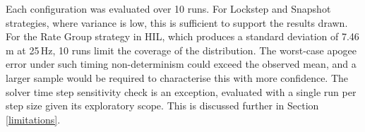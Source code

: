 Each configuration was evaluated over 10 runs. For Lockstep and Snapshot strategies, where variance is low, this is sufficient to support the results drawn. For the Rate Group strategy in HIL, which produces a standard deviation of 7.46\,m at 25\,Hz, 10 runs limit the coverage of the distribution. The worst-case apogee error under such timing non-determinism could exceed the observed mean, and a larger sample would be required to characterise this with more confidence. The solver time step sensitivity check is an exception, evaluated with a single run per step size given its exploratory scope. This is discussed further in Section \ref{limitations}.
